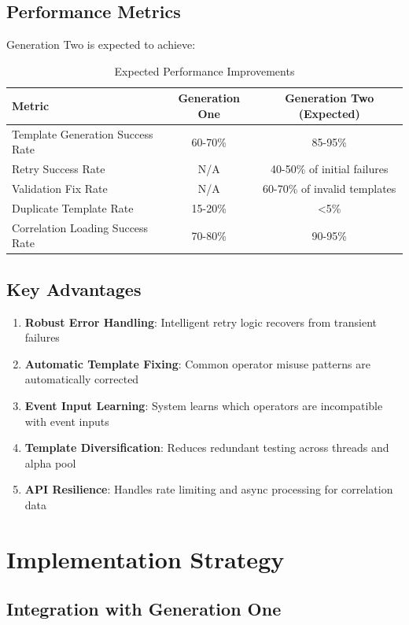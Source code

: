 \subsection{Performance Metrics}

Generation Two is expected to achieve:

\begin{table}[h]
\centering
\begin{tabular}{lcc}
\toprule
Metric & Generation One & Generation Two (Expected) \\
\midrule
Template Generation Success Rate & 60-70\% & 85-95\% \\
Retry Success Rate & N/A & 40-50\% of initial failures \\
Validation Fix Rate & N/A & 60-70\% of invalid templates \\
Duplicate Template Rate & 15-20\% & <5\% \\
Correlation Loading Success Rate & 70-80\% & 90-95\% \\
\bottomrule
\end{tabular}
\caption{Expected Performance Improvements}
\end{table}

\subsection{Key Advantages}

\begin{enumerate}
    \item \textbf{Robust Error Handling}: Intelligent retry logic recovers from transient failures
    \item \textbf{Automatic Template Fixing}: Common operator misuse patterns are automatically corrected
    \item \textbf{Event Input Learning}: System learns which operators are incompatible with event inputs
    \item \textbf{Template Diversification}: Reduces redundant testing across threads and alpha pool
    \item \textbf{API Resilience}: Handles rate limiting and async processing for correlation data
\end{enumerate}

\section{Implementation Strategy}

\subsection{Integration with Generation One}

